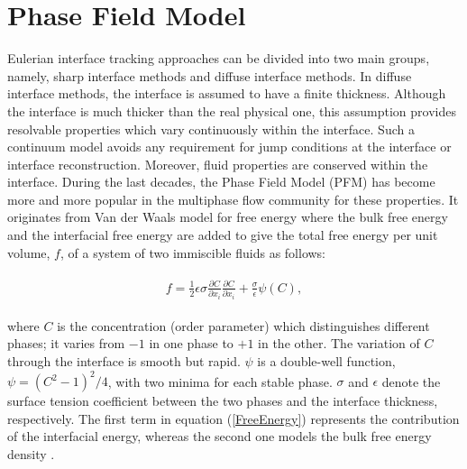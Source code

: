 \documentclass[review]{elsarticle}
\begin{document}
\section{Phase Field Model} \label{Sec:PFM}
Eulerian interface tracking approaches can be divided into two main groups, namely, sharp interface methods and diffuse interface methods.  In diffuse interface methods, the interface is assumed to have a finite thickness. Although the interface is much thicker than the real physical one, this assumption provides resolvable properties which vary continuously within the interface. Such a continuum model avoids any requirement for jump conditions at the interface or interface reconstruction. Moreover, fluid properties are conserved within the interface. During the last decades, the Phase Field Model (PFM) has become more and more popular in the multiphase flow community for these properties. It originates from Van der Waals model for free energy \citep{vanderWaals1893} where the bulk free energy and the interfacial free energy are added to give the total free energy per unit volume, $f$, of a system of two immiscible fluids as follows:
\begin{linenomath}\begin{equation} \label{FreeEnergy}
\begin{aligned}
\begin{gathered}
f= \frac{1}{2} \epsilon \sigma   \frac{\partial C}{\partial x_i}  \frac{\partial C}{\partial x_i} +\frac{\sigma}{\epsilon} \psi (C),
\end{gathered}
\end{aligned}
\end{equation}\end{linenomath}
\sloppy
where $C$ is the concentration (order parameter) which distinguishes different phases; it varies from $-1$ in one phase to $+1$ in the other. The variation of $C$ through the interface is smooth but rapid. $\psi$ is a double-well function, $\psi={(C^2-1)}^2/4$, with two minima for each stable phase. $\sigma$ and $\epsilon$ denote the surface tension coefficient between the two phases and the interface thickness, respectively. The first term in equation (\ref{FreeEnergy}) represents the contribution of the interfacial energy, whereas the second one models the bulk free energy density \citep{Jacqmin1999}.
\end{document}
